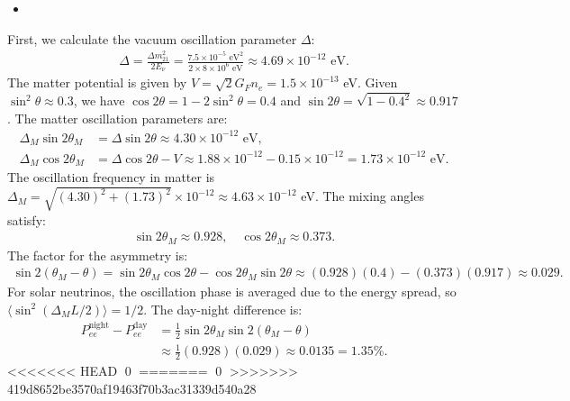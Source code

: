 \begin{itemize}
    \item [(c)]
\end{itemize}
First, we calculate the vacuum oscillation parameter $\Delta$:
\begin{align}
    \Delta = \frac{\Delta m_{21}^2}{2E_\nu} = \frac{7.5 \times 10^{-5} \text{ eV}^2}{2 \times 8 \times 10^6 \text{ eV}} \approx 4.69 \times 10^{-12} \text{ eV}.
\end{align}
The matter potential is given by $V = \sqrt{2}G_F n_e = 1.5 \times 10^{-13}$ eV. Given $\sin^2\theta \approx 0.3$, we have $\cos 2\theta = 1 - 2\sin^2\theta = 0.4$ and $\sin 2\theta = \sqrt{1 - 0.4^2} \approx 0.917$. The matter oscillation parameters are:
\begin{align}
    \Delta_M \sin 2\theta_M &= \Delta \sin 2\theta \approx 4.30 \times 10^{-12} \text{ eV}, \\
    \Delta_M \cos 2\theta_M &= \Delta \cos 2\theta - V \approx 1.88 \times 10^{-12} - 0.15 \times 10^{-12} = 1.73 \times 10^{-12} \text{ eV}.
\end{align}
The oscillation frequency in matter is $\Delta_M = \sqrt{(4.30)^2 + (1.73)^2} \times 10^{-12} \approx 4.63 \times 10^{-12}$ eV. The mixing angles satisfy:
\begin{align}
    \sin 2\theta_M \approx 0.928, \quad \cos 2\theta_M \approx 0.373.
\end{align}
The factor for the asymmetry is:
\begin{align}
    \sin 2(\theta_M - \theta) = \sin 2\theta_M \cos 2\theta - \cos 2\theta_M \sin 2\theta \approx (0.928)(0.4) - (0.373)(0.917) \approx 0.029.
\end{align}
For solar neutrinos, the oscillation phase is averaged due to the energy spread, so $\langle \sin^2 (\Delta_M L / 2) \rangle = 1/2$. The day-night difference is:
\begin{align}
    P_{ee}^{\text{night}} - P_{ee}^{\text{day}} &= \frac{1}{2} \sin 2\theta_M \sin 2(\theta_M - \theta) \nonumber \\
    &\approx \frac{1}{2} (0.928)(0.029) \approx 0.0135 = 1.35\%.
\end{align}
<<<<<<< HEAD
\qed
=======
\qed
>>>>>>> 419d8652be3570af19463f70b3ac31339d540a28
